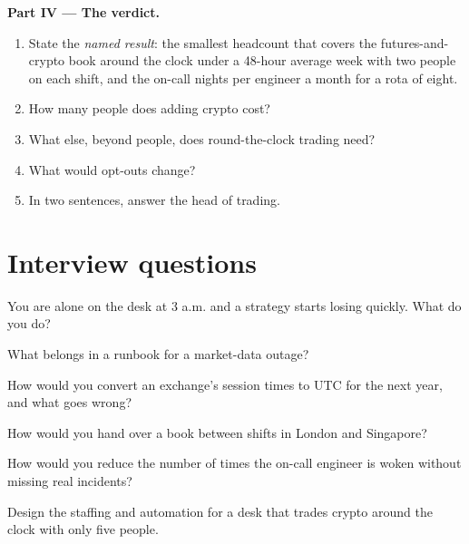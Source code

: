 \begin{problem}
\medskip\noindent\textbf{Part IV --- The verdict.}
\begin{enumerate}[resume]
\item State the \emph{named result}: the smallest headcount that covers the futures-and-crypto book around the clock under
a 48-hour average week with two people on each shift, and the on-call nights per engineer a month for a rota of eight.
\item How many people does adding crypto cost?
\item What else, beyond people, does round-the-clock trading need?
\item What would opt-outs change?
\item In two sentences, answer the head of trading.
\end{enumerate}
\end{problem}

\section{Interview questions}

\begin{interviewq}\label{iq:in:hours-rhythm-and-intensity:1}
You are alone on the desk at 3 a.m. and a strategy starts losing quickly. What do you do?
\end{interviewq}

\begin{interviewq}\label{iq:in:hours-rhythm-and-intensity:2}
What belongs in a runbook for a market-data outage?
\end{interviewq}

\begin{interviewq}\label{iq:in:hours-rhythm-and-intensity:3}
How would you convert an exchange's session times to UTC for the next year, and what goes wrong?
\end{interviewq}

\begin{interviewq}\label{iq:in:hours-rhythm-and-intensity:4}
How would you hand over a book between shifts in London and Singapore?
\end{interviewq}

\begin{interviewq}\label{iq:in:hours-rhythm-and-intensity:5}
How would you reduce the number of times the on-call engineer is woken without missing real incidents?
\end{interviewq}

\begin{interviewq}\label{iq:in:hours-rhythm-and-intensity:6}
Design the staffing and automation for a desk that trades crypto around the clock with only five people.
\end{interviewq}
